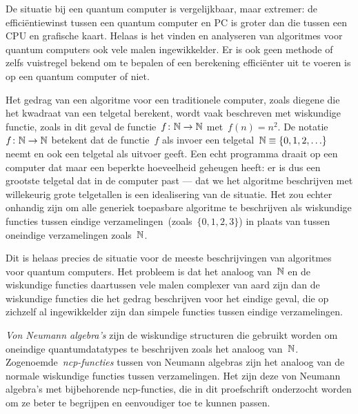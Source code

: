 De situatie bij een quantum computer is vergelijkbaar, maar extremer:
    de effici\"entiewinst tussen een quantum computer en PC
    is groter dan die tussen een CPU en grafische kaart.
Helaas is het vinden en analyseren van algoritmes voor quantum computers
    ook vele malen ingewikkelder.
Er is ook geen methode of zelfs vuistregel bekend
    om te bepalen of een berekening effici\"enter uit te voeren
    is op een quantum computer of niet.


Het gedrag van een algoritme voor een traditionele computer,
    zoals diegene die het kwadraat van een telgetal berekent,
    wordt vaak beschreven met wiskundige functie,
    zoals in dit geval de functie~$f\colon \mathbb{N} \to \mathbb{N}$
        met~$f(n) = n^2$.
De notatie~$f\colon \mathbb{N} \to \mathbb{N}$
    betekent dat de functie~$f$ als invoer
    een telgetal~$\mathbb{N} \equiv \{0, 1, 2, \ldots \}$
    neemt en ook een telgetal als uitvoer geeft.
Een echt programma draait op een computer
    dat maar een beperkte hoeveelheid geheugen heeft:
        er is dus een grootste telgetal dat in de computer past
        --- dat we het algoritme beschrijven
    met willekeurig grote telgetallen is een idealisering van de situatie.
Het zou echter onhandig zijn om alle generiek toepasbare algoritme
    te beschrijven als wiskundige functies tussen
    eindige verzamelingen~(zoals~$\{0, 1, 2, 3\}$)
    in plaats van tussen oneindige verzamelingen zoals~$\mathbb{N}$.

Dit is helaas precies de situatie voor de meeste beschrijvingen van
    algoritmes voor quantum computers.
Het probleem is dat het analoog van~$\mathbb{N}$
    en de wiskundige functies daartussen
    vele malen complexer van aard zijn
    dan de wiskundige functies die het gedrag
    beschrijven voor het eindige geval,
    die op zichzelf al ingewikkelder zijn dan
    simpele functies tussen eindige verzamelingen.

\emph{Von Neumann algebra's} zijn de wiskundige structuren
    die gebruikt worden om oneindige quantumdatatypes
    te beschrijven zoals het analoog van~$\mathbb{N}$.
Zogenoemde~\emph{ncp-functies} tussen von Neumann algebras
    zijn het analoog van de normale wiskundige functies
    tussen verzamelingen.
Het zijn deze von Neumann algebra's met bijbehorende
    ncp-functies, die in dit proefschrift onderzocht worden
    om ze beter te begrijpen en eenvoudiger toe te kunnen passen.

